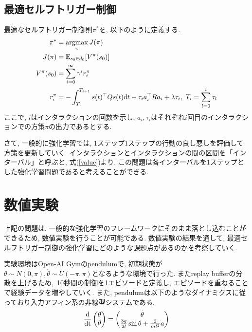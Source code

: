 \documentclass[dvipdfmx]{ampmt}
\newcommand{\argmax}{\mathop{\rm argmax}\limits}
\newcommand{\expect}{\mathbb{E}}
\newcommand{\odif}[2]{\frac{\rm{d}#1}{\rm{d}#2}}
\begin{document}
\subsection{最適セルフトリガー制御}
最適なセルフトリガー制御則$\pi^{*}$を, 以下のように定義する. 
\begin{align}
	\pi^{*} &= \argmax_{\pi}J(\pi) \label{optimal_policy}\\
	J(\pi) &= \expect_{s_0\in d_0}[V^{\pi}(s_0)] \\
	V^{\pi}(s_0) &= \sum_{i=0}^{\infty} \gamma^i r^{\pi}_i \label{value} \\
	r^{\pi}_i &= -\int_{T_i}^{T_{i+1}}s(t)^{\top}Qs(t)\textrm{d}t +\tau_ia_i^{\top}Ra_i + \lambda \tau_i, ~T_i = \sum_{l=0}^{i} \tau_l \label{reward}
\end{align}
ここで, $i$はインタラクションの回数を示し, $a_i, \tau_i$はそれぞれ$i$回目のインタラクションでの方策$\pi$の出力であるとする. \par
さて, 一般的に強化学習では, 1ステップ1ステップの行動の良し悪しを評価して方策を更新していく. 
インタラクションとインタラクションの間の区間を「インターバル」と呼ぶと, 式(\ref{value})より, この問題は各インターバルを1ステップとした強化学習問題であると考えることができる. \par

\section{数値実験}
上記の問題は, 一般的な強化学習のフレームワークにそのまま落とし込むことができるため, 数値実験を行うことが可能である. 数値実験の結果を通して, 最適セルフトリガー制御の強化学習にどのような課題点があるのかを考察していく.\par
実験環境はOpen-AI Gymのpendulumで, 初期状態が$\theta\sim N(0, \pi), \dot{\theta}\sim U(-\pi,\pi)$となるような環境で行った. またreplay bufferの分散を上げるため,~10秒間の制御を1エピソードと定義し, エピソードを重ねることで経験データを増やしていく. また, pendulumは以下のようなダイナミクスに従っており入力アフィン系の非線型システムである.
\begin{equation}
	\odif{}{t}\begin{pmatrix}\theta \\ \dot{\theta}\end{pmatrix} = 
		\begin{pmatrix}\dot{\theta} \\ \frac{3g}{2l}\sin{\theta} + \frac{3}{ml^2}a \end{pmatrix} \label{pendulum}
\end{equation}
\end{document}
